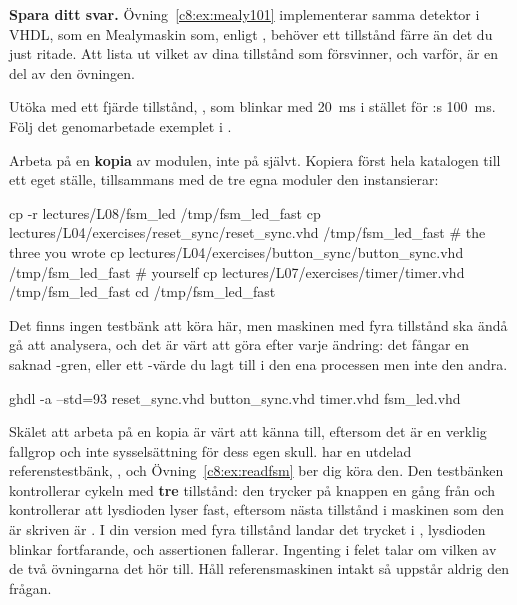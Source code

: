 \textbf{Spara ditt svar.} Övning~\ref{c8:ex:mealy101} implementerar samma detektor i VHDL, som en
Mealymaskin \textemdash{} som, enligt , behöver ett tillstånd färre än det du
just ritade. Att lista ut vilket av dina tillstånd som försvinner, och varför, är en del av den
övningen.


\label{c8:ex:fastblink}
Utöka  med ett fjärde tillstånd, , som blinkar med 20~ms i
stället för :s 100~ms. Följ det genomarbetade exemplet i .

Arbeta på en \textbf{kopia} av modulen, inte på  självt.
Kopiera först hela katalogen till ett eget ställe, tillsammans med de tre egna moduler den
instansierar:

\begin{shell}
cp -r lectures/L08/fsm_led /tmp/fsm_led_fast
cp lectures/L04/exercises/reset_sync/reset_sync.vhd /tmp/fsm_led_fast     # the three you wrote
cp lectures/L04/exercises/button_sync/button_sync.vhd /tmp/fsm_led_fast   # yourself
cp lectures/L07/exercises/timer/timer.vhd /tmp/fsm_led_fast
cd /tmp/fsm_led_fast
\end{shell}

Det finns ingen testbänk att köra här, men maskinen med fyra tillstånd ska ändå gå att analysera,
och det är värt att göra efter varje ändring: det fångar en saknad -gren, eller ett
-värde du lagt till i den ena processen men inte den andra.

\begin{shell}
ghdl -a --std=93 reset_sync.vhd button_sync.vhd timer.vhd fsm_led.vhd
\end{shell}

\begin{warning}
Skälet att arbeta på en kopia är värt att känna till, eftersom det är en verklig fallgrop och inte
sysselsättning för dess egen skull.  har en utdelad referenstestbänk,
, och Övning~\ref{c8:ex:readfsm} ber dig köra den. Den testbänken kontrollerar
cykeln med \textbf{tre} tillstånd: den trycker på knappen en gång från  och
kontrollerar att lysdioden lyser fast, eftersom nästa tillstånd i maskinen som den är skriven är
. I din version med fyra tillstånd landar det trycket i ,
lysdioden blinkar fortfarande, och assertionen fallerar. Ingenting i felet talar om vilken av de två
övningarna det hör till. Håll referensmaskinen intakt så uppstår aldrig den frågan.
\end{warning}

